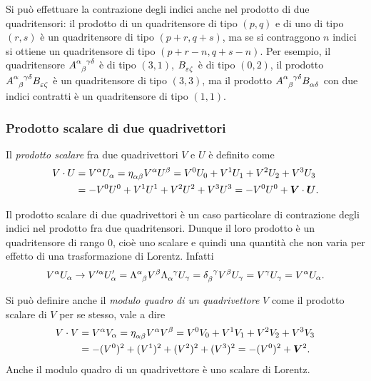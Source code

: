 Si può effettuare la contrazione degli indici anche nel prodotto di due
quadritensori: il prodotto di un quadritensore di tipo $(p,q)$ e di uno di tipo
$(r,s)$ è un quadritensore di tipo $(p+r,q+s)$, ma se si contraggono $n$ indici
si ottiene un quadritensore di tipo $(p+r-n,q+s-n)$.  Per esempio, il
quadritensore $\tensor{A}{^{\alpha}_{\beta}^{\gamma\delta}}$ è di tipo $(3,1)$,
$\tensor{B}{_{\epsilon\zeta}}$ è di tipo $(0,2)$, il prodotto
$\tensor{A}{^{\alpha}_{\beta}^{\gamma\delta}} \tensor{B}{_{\epsilon\zeta}}$ è un
quadritensore di tipo $(3,3)$, ma il prodotto
$\tensor{A}{^{\alpha}_{\beta}^{\gamma\delta}} \tensor{B}{_{\alpha\delta}}$ con
due indici contratti è un quadritensore di tipo $(1,1)$.

\subsubsection{Prodotto scalare di due quadrivettori}
\label{sec:prodotto-scalare-quadrivettori}

Il \emph{prodotto scalare} fra due quadrivettori $V$ e $U$ è definito come
\begin{equation}
  \begin{split}
    V\cdot U &= V^{\alpha}U_{\alpha} =
    \tensor{\eta}{_{\alpha\beta}}V^{\alpha}U^{\beta} = V^{0}U_{0} + V^{1}U_{1} +
    V^{2}U_{2} + V^{3}U_{3} \\
    &= -V^{0}U^{0} + V^{1}U^{1} + V^{2}U^{2} + V^{3}U^{3} = -V^{0}U^{0} +
    \bm{V}\cdot\bm{U}.
  \end{split}
\end{equation}

Il prodotto scalare di due quadrivettori è un caso particolare di contrazione
degli indici nel prodotto fra due quadritensori.  Dunque il loro prodotto è un
quadritensore di rango $0$, cioè uno scalare e quindi una quantità che non varia
per effetto di una trasformazione di Lorentz.  Infatti
\begin{equation}
  V^{\alpha}U_{\alpha} \to V'^{\alpha}U'_{\alpha} =
  \tensor{\Lambda}{^{\alpha}_{\beta}} V^{\beta}
  \tensor{\Lambda}{_{\alpha}^{\gamma}} U_{\gamma} =
  \tensor{\delta}{_{\beta}^{\gamma}} V^{\beta} U_{\gamma} = V^{\gamma}U_{\gamma}
  = V^{\alpha} U_{\alpha}.
\end{equation}

Si può definire anche il \emph{modulo
  quadro di un quadrivettore}
$V$ come il prodotto scalare di $V$ per se stesso, vale a dire
\begin{equation}
  \begin{split}
    V\cdot V &= V^{\alpha}V_{\alpha} =
    \tensor{\eta}{_{\alpha\beta}}V^{\alpha}V^{\beta} = V^{0}V_{0} + V^{1}V_{1} +
    V^{2}V_{2} + V^{3}V_{3} \\
    &= -(V^{0})^{2} + (V^{1})^{2} + (V^{2})^{2} + (V^{3})^{2} = -(V^{0})^{2} +
    \bm{V}^{2}.
  \end{split}
\end{equation}
Anche il modulo quadro di un quadrivettore è uno scalare di Lorentz.

